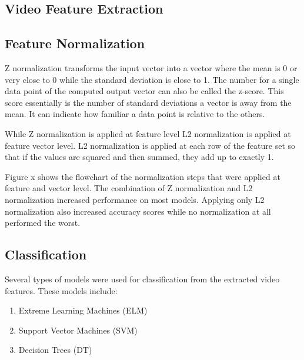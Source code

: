 \subsection{Video Feature Extraction}

\subsection{Feature Normalization}
\label{section:normalization}
Z normalization transforms the input vector into a vector where the mean is 0 or very close to 0 while the standard deviation is close to 1. The number for a single data point of the computed output vector can also be called the z-score. This score essentially is the number of standard deviations a vector is away from the mean. It can indicate how familiar a data point is relative to the others. 

While Z normalization is applied at feature level L2 normalization is applied at feature vector level. L2 normalization is applied at each row of the feature set so that if the values are squared and then summed, they add up to exactly 1. 

Figure x shows the flowchart of the normalization steps that were applied at feature and vector level. The combination of Z normalization and L2 normalization increased performance on most models. Applying only L2 normalization also increased accuracy scores while no normalization at all performed the worst. 

\subsection{Classification}
Several types of models were used for classification from the extracted video features. These models include:
\begin{enumerate}
\item Extreme Learning Machines (ELM)
\item Support Vector Machines (SVM)
\item Decision Trees (DT)
\end{enumerate}





